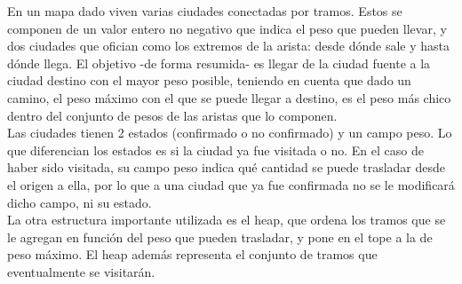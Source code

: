 En un mapa dado viven varias ciudades conectadas por tramos. Estos se componen de un valor entero no negativo que indica el peso que pueden llevar, y dos ciudades que ofician como los extremos de la arista: desde dónde sale y hasta dónde llega. El
objetivo -de forma resumida- es llegar de la ciudad fuente a la ciudad destino
con el mayor peso posible, teniendo en cuenta que dado un camino, el peso máximo
con el que se puede llegar a destino, es el peso más chico dentro del conjunto
de pesos de las aristas que lo componen.\\
\indent Las ciudades tienen 2 estados (confirmado o no confirmado) y un campo peso. Lo que diferencian los estados es si la ciudad ya fue visitada o no. En el caso de haber sido visitada, su campo peso indica qué cantidad se puede trasladar desde el origen a ella, por lo que a una ciudad que ya fue confirmada no se le modificará dicho campo, ni su estado.\\
\indent La otra estructura importante utilizada es el heap, que ordena los tramos que se le agregan en función del peso que pueden trasladar, y pone en el tope a la de peso máximo. El heap además representa el conjunto de tramos que eventualmente se visitarán.\\

